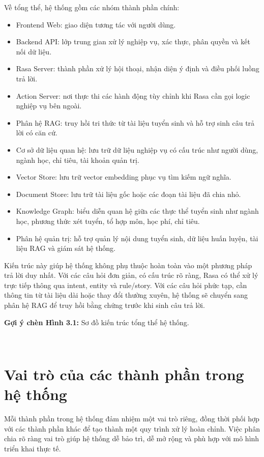 \documentclass[12pt,a4paper]{report}
\begin{document}
Về tổng thể, hệ thống gồm các nhóm thành phần chính:
\begin{itemize}
    \item Frontend Web: giao diện tương tác với người dùng.
    \item Backend API: lớp trung gian xử lý nghiệp vụ, xác thực, phân quyền và kết nối dữ liệu.
    \item Rasa Server: thành phần xử lý hội thoại, nhận diện ý định và điều phối luồng trả lời.
    \item Action Server: nơi thực thi các hành động tùy chỉnh khi Rasa cần gọi logic nghiệp vụ bên ngoài.
    \item Phân hệ RAG: truy hồi tri thức từ tài liệu tuyển sinh và hỗ trợ sinh câu trả lời có căn cứ.
    \item Cơ sở dữ liệu quan hệ: lưu trữ dữ liệu nghiệp vụ có cấu trúc như người dùng, ngành học, chỉ tiêu, tài khoản quản trị.
    \item Vector Store: lưu trữ vector embedding phục vụ tìm kiếm ngữ nghĩa.
    \item Document Store: lưu trữ tài liệu gốc hoặc các đoạn tài liệu đã chia nhỏ.
    \item Knowledge Graph: biểu diễn quan hệ giữa các thực thể tuyển sinh như ngành học, phương thức xét tuyển, tổ hợp môn, học phí, chỉ tiêu.
    \item Phân hệ quản trị: hỗ trợ quản lý nội dung tuyển sinh, dữ liệu huấn luyện, tài liệu RAG và giám sát hệ thống.
\end{itemize}

Kiến trúc này giúp hệ thống không phụ thuộc hoàn toàn vào một phương pháp trả lời duy nhất. Với các câu hỏi đơn giản, có cấu trúc rõ ràng, Rasa có thể xử lý trực tiếp thông qua intent, entity và rule/story. Với các câu hỏi phức tạp, cần thông tin từ tài liệu dài hoặc thay đổi thường xuyên, hệ thống sẽ chuyển sang phân hệ RAG để truy hồi bằng chứng trước khi sinh câu trả lời.

\textbf{Gợi ý chèn Hình 3.1:} Sơ đồ kiến trúc tổng thể hệ thống.

﻿\section{Vai trò của các thành phần trong hệ thống}

Mỗi thành phần trong hệ thống đảm nhiệm một vai trò riêng, đồng thời phối hợp với các thành phần khác để tạo thành một quy trình xử lý hoàn chỉnh. Việc phân chia rõ ràng vai trò giúp hệ thống dễ bảo trì, dễ mở rộng và phù hợp với mô hình triển khai thực tế.
\end{document}
